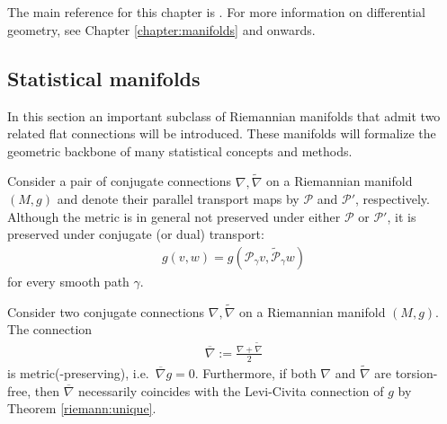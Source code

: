 \chapter{}\label{chapter:info}

    The main reference for this chapter is \cite{amari}. For more information on differential geometry, see Chapter \ref{chapter:manifolds} and onwards.

\section{Statistical manifolds}

    In this section an important subclass of Riemannian manifolds that admit two related flat connections will be introduced. These manifolds will formalize the geometric backbone of many statistical concepts and methods.

    \begin{property}
        Consider a pair of conjugate connections $\nabla,\widetilde{\nabla}$ on a Riemannian manifold $(M,g)$ and denote their parallel transport maps by $\mathcal{P}$ and $\mathcal{P'}$, respectively. Although the metric is in general not preserved under either $\mathcal{P}$ or $\mathcal{P}'$, it is preserved under conjugate (or dual) transport:
        \begin{gather}
            g(v,w) = g\left(\mathcal{P}_\gamma v,\widetilde{\mathcal{P}}_\gamma w\right)
        \end{gather}
        for every smooth path $\gamma$.
    \end{property}

    \begin{property}
        Consider two conjugate connections $\nabla,\widetilde{\nabla}$ on a Riemannian manifold $(M,g)$. The connection
        \begin{gather}
            \overline{\nabla} := \frac{\nabla+\widetilde{\nabla}}{2}
        \end{gather}
        is metric(-preserving), i.e.~$\overline{\nabla}g=0$. Furthermore, if both $\nabla$ and $\widetilde{\nabla}$ are torsion-free, then $\overline{\nabla}$ necessarily coincides with the Levi-Civita connection of $g$ by Theorem \ref{riemann:unique}.
    \end{property}

